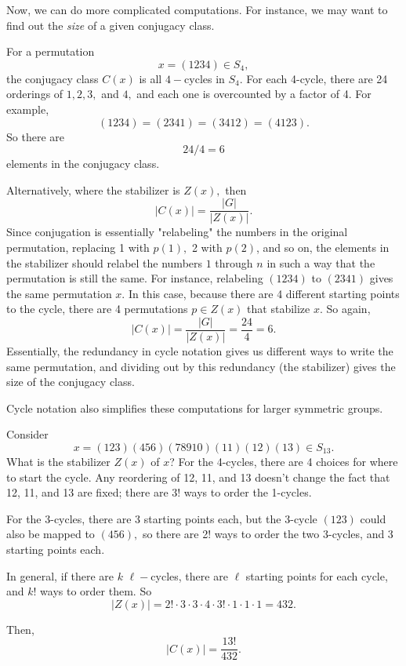 Now, we can do more complicated computations. For instance, we may want to find out the \emph{size} of a given conjugacy class.

\begin{example}
For a permutation \[x = (1234) \in S_4,\] the conjugacy class $C(x)$ is all $4-$cycles in $S_4.$ For each 4-cycle, there are 24 orderings of $1, 2, 3,$ and $4,$ and each one is overcounted by a factor of 4. For example, \[(1234) = (2341) = (3412) = (4123).\] So there are \[24/4 = \boxed{6}\] elements in the conjugacy class. 

Alternatively, where the stabilizer is $Z(x),$ then \[|C(x)| = \frac{|G|}{|Z(x)|}.\] Since conjugation is essentially "relabeling" the numbers in the original permutation, replacing 1 with $p(1),$ 2 with $p(2)$, and so on, the elements in the stabilizer should relabel the numbers $1$ through $n$ in such a way that the permutation is still the same. For instance, relabeling $(1234)$ to $(2341)$ gives the same permutation $x.$ In this case, because there are 4 different starting points to the cycle, there are 4 permutations $p \in Z(x)$ that stabilize $x.$ So again, \[|C(x)| = \frac{|G|}{|Z(x)|} = \frac{24}{4} = 6.\] Essentially, the redundancy in cycle notation gives us different ways to write the same permutation, and dividing out by this redundancy (the stabilizer) gives the size of the conjugacy class.
\end{example}

Cycle notation also simplifies these computations for larger symmetric groups.

\begin{example}
Consider \[x = (123)(456)(789 10)(11)(12)(13) \in S_{13}.\] What is the stabilizer $Z(x)$ of $x$? For the 4-cycles, there are 4 choices for where to start the cycle. Any reordering of 12, 11, and 13 doesn't change the fact that 12, 11, and 13 are fixed; there are $3!$ ways to order the 1-cycles. 

For the 3-cycles, there are 3 starting points each, but the 3-cycle $(123)$ could also be mapped to $(456),$ so there are 2! ways to order the two 3-cycles, and 3 starting points each. 

In general, if there are $k$ $\ell-$cycles, there are $\ell$ starting points for each cycle, and $k!$ ways to order them. So 
\[
|Z(x)| = 2!\cdot  3 \cdot 3 \cdot  4\cdot 3! \cdot 1 \cdot 1 \cdot 1 = 432.
\]

Then,
\[
|C(x)| = \frac{13!}{432}.
\]
\end{example}

